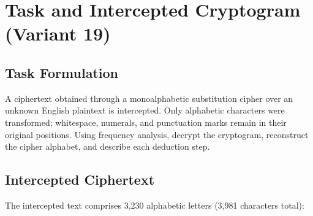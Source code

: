 \documentclass[12pt,a4paper]{article}
\begin{document}
\section{Task and Intercepted Cryptogram (Variant 19)}

\subsection{Task Formulation}
A ciphertext obtained through a monoalphabetic substitution cipher over an unknown English plaintext is intercepted. Only alphabetic characters were transformed; whitespace, numerals, and punctuation marks remain in their original positions. Using frequency analysis, decrypt the cryptogram, reconstruct the cipher alphabet, and describe each deduction step.

\subsection{Intercepted Ciphertext}
The intercepted text comprises 3,230 alphabetic letters (3,981 characters total):
\end{document}
